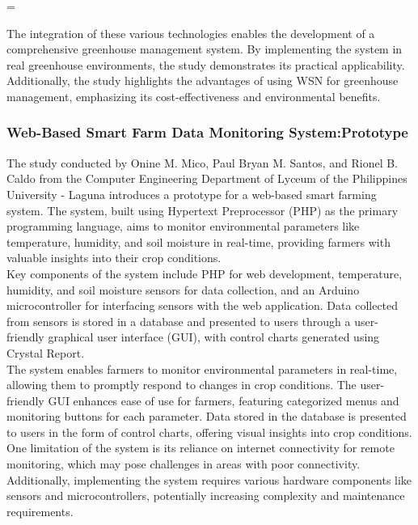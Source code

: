 =\documentclass[12pt, a4paper]{article}
\begin{document}
The integration of these various technologies enables the development of a comprehensive greenhouse management system. By implementing the system in real greenhouse environments, the study demonstrates its practical applicability. Additionally, the study highlights the advantages of using WSN for greenhouse management, emphasizing its cost-effectiveness and environmental benefits.

\subsubsection{Web-Based Smart Farm Data Monitoring System:Prototype}
The study conducted by Onine M. Mico, Paul Bryan M. Santos, and Rionel B. Caldo \cite{mico2016web} from the Computer Engineering Department of Lyceum of the Philippines University - Laguna introduces a prototype for a web-based smart farming system. The system, built using Hypertext Preprocessor (PHP) as the primary programming language, aims to monitor environmental parameters like temperature, humidity, and soil moisture in real-time, providing farmers with valuable insights into their crop conditions.\\
Key components of the system include PHP for web development, temperature, humidity, and soil moisture sensors for data collection, and an Arduino microcontroller for interfacing sensors with the web application. Data collected from sensors is stored in a database and presented to users through a user-friendly graphical user interface (GUI), with control charts generated using Crystal Report.\\
The system enables farmers to monitor environmental parameters in real-time, allowing them to promptly respond to changes in crop conditions. The user-friendly GUI enhances ease of use for farmers, featuring categorized menus and monitoring buttons for each parameter. Data stored in the database is presented to users in the form of control charts, offering visual insights into crop conditions.\\
One limitation of the system is its reliance on internet connectivity for remote monitoring, which may pose challenges in areas with poor connectivity. Additionally, implementing the system requires various hardware components like sensors and microcontrollers, potentially increasing complexity and maintenance requirements.
\end{document}

